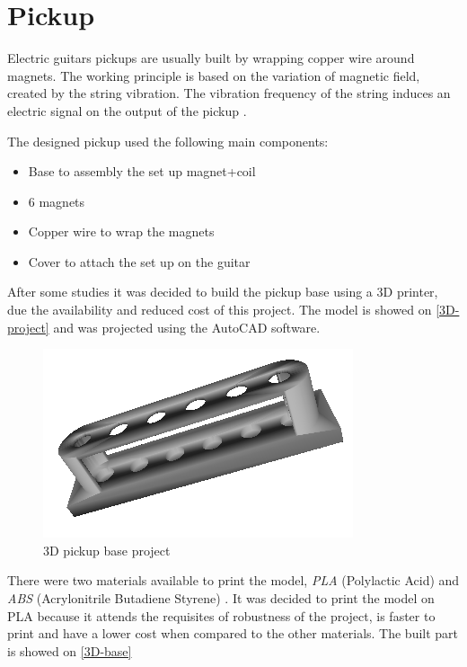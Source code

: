 \section{Pickup}
\label{pickup}

Electric guitars pickups are usually built by wrapping copper wire around magnets.
The working principle is based on the variation of magnetic field, created by the string
vibration. The vibration frequency of the string induces an electric signal on the output of the pickup \cite{pickup-work}
\cite{faraday-law}.

The designed pickup used the following main components:

{\begin{itemize}
  \item Base to assembly the set up magnet+coil
  \item 6 magnets
  \item Copper wire to wrap the magnets
  \item Cover to attach the set up on the guitar
\end{itemize}}

After some studies it was decided to build the pickup base using a 3D printer, due the
availability and reduced cost of this project. The model is showed on \autoref{3D-project}
and was projected using the AutoCAD software.

\begin{figure}[!htpb]
\centering
\caption{3D pickup base project}
\label{3D-project}
\includegraphics[scale=0.5]{images/pickup}
\end{figure}

There were two materials available to print the model, \textit{PLA} (Polylactic Acid) \cite{3d-materials}
and \textit{ABS} (Acrylonitrile Butadiene Styrene) \cite{3d-materials}. It was decided to print
the model on PLA because it attends the requisites of robustness of the project, is
faster to print and have a lower cost when compared to the other materials. The built part is showed on
\autoref{3D-base}

